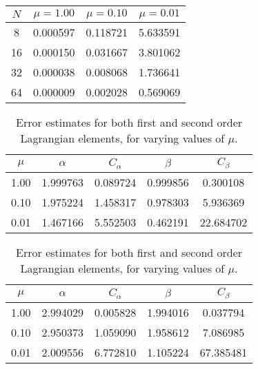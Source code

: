 \documentclass[]{article}
\begin{document}
\begin{table}[htpb]
    \begin{tabular}{cccc}
        \toprule
        {$N$} &         $\mu = 1.00$ &         $\mu = 0.10$ &       $\mu=0.01$ \\
        \midrule
        8  &  0.000597 &  0.118721 &  5.633591 \\
        16 &  0.000150 &  0.031667 &  3.801062 \\
        32 &  0.000038 &  0.008068 &  1.736641 \\
        64 &  0.000009 &  0.002028 &  0.569069 \\
        \bottomrule
    \end{tabular}
\end{table}

\begin{table}[htpb]
    \centering
    \caption{Error estimates for both first and second order Lagrangian
    elements, for varying values of $\mu$.}
    \label{tbl:error_estimates_no_supg}
    
    \begin{tabular}{ccccc}
        \toprule
        {$\mu$} &    $\alpha$ &    $C_\alpha$ &      $\beta$ &    $C_\beta$ \\
        \midrule
        1.00 &  1.999763 &  0.089724 &  0.999856 &   0.300108 \\
        0.10 &  1.975224 &  1.458317 &  0.978303 &   5.936369 \\
        0.01 &  1.467166 &  5.552503 &  0.462191 &  22.684702 \\
        \bottomrule
    \end{tabular}\vspace{2em}
    \begin{tabular}{ccccc}
        \toprule
        {$\mu$} &    $\alpha$ &    $C_\alpha$ &      $\beta$ &    $C_\beta$ \\
        \midrule
        1.00 &  2.994029 &  0.005828 &  1.994016 &   0.037794 \\
        0.10 &  2.950373 &  1.059090 &  1.958612 &   7.086985 \\
        0.01 &  2.009556 &  6.772810 &  1.105224 &  67.385481 \\
        \bottomrule
    \end{tabular}
\end{table}
\end{document}
